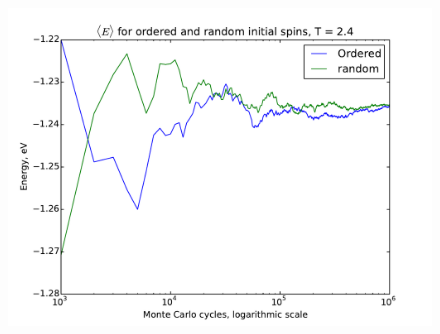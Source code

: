 	\begin{figure}[H]

		\includegraphics[width=1\linewidth]{../results/4c/ran_order_T2}
		\caption{}
		\label{fig:ranordert2}
	\end{figure}
	